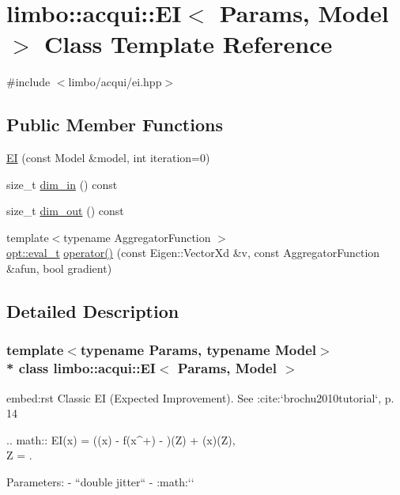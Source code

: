 \hypertarget{classlimbo_1_1acqui_1_1_e_i}{}\section{limbo\+:\+:acqui\+:\+:EI$<$ Params, Model $>$ Class Template Reference}
\label{classlimbo_1_1acqui_1_1_e_i}


{\ttfamily \#include $<$limbo/acqui/ei.\+hpp$>$}

\subsection*{Public Member Functions}
\begin{DoxyCompactItemize}
\item 
\hyperlink{classlimbo_1_1acqui_1_1_e_i_aa1e8c3ae70c75d10adf188e0c260a03a}{EI} (const Model \&model, int iteration=0)
\item 
size\+\_\+t \hyperlink{classlimbo_1_1acqui_1_1_e_i_a52d965602aa60609e3f4f447dbea285b}{dim\+\_\+in} () const 
\item 
size\+\_\+t \hyperlink{classlimbo_1_1acqui_1_1_e_i_a7b030343c6dae9af80853cfab0868e8d}{dim\+\_\+out} () const 
\item 
{\footnotesize template$<$typename Aggregator\+Function $>$ }\\\hyperlink{group__opt__tools_ga362b55973a38ac71f27a06f9d9c14f24}{opt\+::eval\+\_\+t} \hyperlink{classlimbo_1_1acqui_1_1_e_i_a02e0c42197cd45d6b6bb1dc9c91af06d}{operator()} (const Eigen\+::\+Vector\+Xd \&v, const Aggregator\+Function \&afun, bool gradient)
\end{DoxyCompactItemize}


\subsection{Detailed Description}
\subsubsection*{template$<$typename Params, typename Model$>$\\*
class limbo\+::acqui\+::\+E\+I$<$ Params, Model $>$}

\begin{DoxyVerb}embed:rst
Classic EI (Expected Improvement). See :cite:`brochu2010tutorial`, p. 14

  .. math::
    EI(x) = (\mu(x) - f(x^+) - \xi)\Phi(Z) + \sigma(x)\phi(Z),\\ Z = .

Parameters:
  - ``double jitter`` - :math:`\xi`
\end{DoxyVerb}
 

